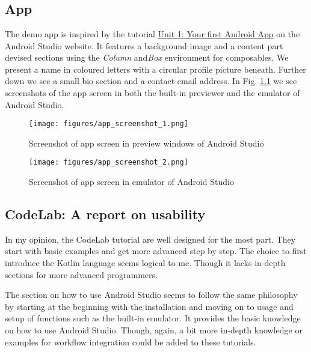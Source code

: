 \chapter{}

\section{App}
The demo app is inspired by the tutorial \href{https://developer.android.com/courses/android-basics-compose/unit-1}{Unit 1: Your first Android App} on the Android Studio website. It features a background image and a content part devised sections using the \textsl{Column} and\textsl{Box} environment for composables. We present a name in coloured letters with a circular profile picture beneath. Further down we see a small bio section and a contact email address.
In Fig. \ref{fig:app_screen} we see screenshots of the app screen in both the built-in previewer and the emulator of Android Studio.


\begin{figure}
	\centering
	\texttt{[image: figures/app\_screenshot\_1.png]}
	\caption{Screenshot of app screen in preview windows of Android Studio}
	\texttt{[image: figures/app\_screenshot\_2.png]}
	\caption{Screenshot of app screen in emulator of Android Studio}
	\label{fig:app_screen}
\end{figure}

\section{CodeLab: A report on usability}
In my opinion, the CodeLab tutorial are well designed for the most part. They start with basic examples and get more advanced step by step. The choice to first introduce the Kotlin language seems logical to me. Though it lacks in-depth sections for more advanced programmers.

The section on how to use Android Studio seems to follow the same philosophy by starting at the beginning with the installation and moving on to usage and setup of functions such as the built-in emulator. It provides the basic knowledge on how to use Android Studio. Though, again, a bit more in-depth knowledge or examples for workflow integration could be added to these tutorials.

